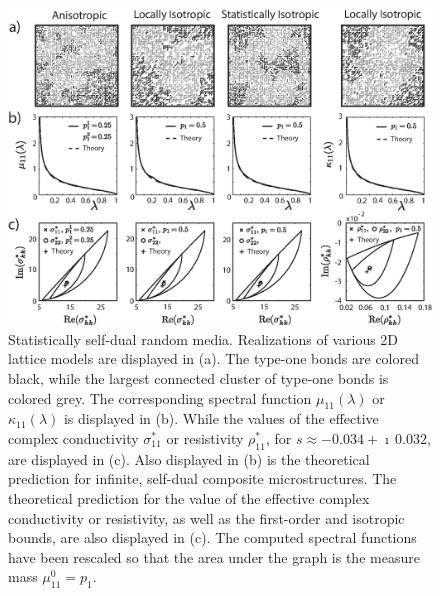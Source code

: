 \documentclass{cmslatex}
\begin{document}
%
%
\begin{figure}[t]
  \centerline{\includegraphics[scale=0.69]{A_Duality_RRN_11.eps}}
\caption{Statistically self-dual random media. Realizations of various 
  2D lattice models are displayed in (a). The type-one
  bonds are colored black, while the largest connected cluster of
  type-one bonds is colored grey. The corresponding spectral function
  $\mu_{11}(\lambda)$ or $\kappa_{11}(\lambda)$ is displayed in (b). While the values of the
  effective complex conductivity $\sigma^*_{11}$ or resistivity $\rho^*_{11}$,
  for $s\approx-0.034+\imath\,0.032$, are displayed in (c). Also displayed in
  (b) is the theoretical prediction for infinite, self-dual composite
  microstructures. The theoretical prediction for 
  the value of the effective complex conductivity or resistivity, as
  well as the first-order and isotropic bounds, are also displayed in
  (c). The computed spectral functions have been rescaled so that the
  area under the graph is the measure mass $\mu^0_{11}=p_1$.                
        }
\label{fig:Duality_RRN_11}
\end{figure}
%
\end{document}
